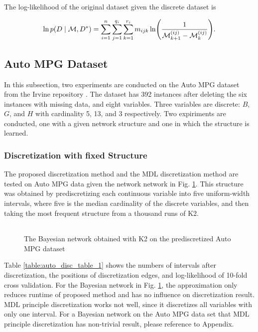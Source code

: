 The log-likelihood of the original dataset given the discrete dataset is

\begin{equation}
  \ln p(D\mid \discset, D^*) = \sum_{i=1}^n \sum_{j=1}^{q_i} \sum_{k=1}^{r_i} m_{ijk} \ln\paren{
    \frac{
      1
    }{
      \discset^{(ij)}_{k+1} - \discset^{(ij)}_{k}
    }
  }\text{.}
\end{equation}

\subsection{Auto MPG Dataset}
\label{subsec:auto}

In this subsection, two experiments are conducted on the Auto MPG dataset from the Irvine repository \citep{Lichman_2013}. The dataset has \num{392} instances after deleting the six instances with missing data, and eight variables. Three variables are discrete: $B$, $G$, and $H$ with cardinality 5, 13, and 3 respectively. Two expiriments are conducted, one with a given network structure and one in which the structure is learned.

\subsubsection{Discretization with fixed Structure}
\label{subsubsec:auto_exp1}

The proposed discretization method and the MDL discretization method are tested on Auto MPG data given the network network in Fig. \ref{fig:auto_graph_1}. This structure was obtained by prediscretizing each continuous variable into five uniform-width intervals, where five is the median cardinality of the discrete variables, and then taking the most frequent structure from a thousand runs of K2.

\begin{figure}[ht]
  \centering
  \begin{tabular}{cc}
    
  \end{tabular}
  \caption{The Bayesian network obtained with K2 on the prediscretized Auto MPG dataset}
  \label{fig:auto_graph_1}
\end{figure}

Table \ref{table:auto_disc_table_1} shows the numbers of intervals after discretization, the positions of discretization edges, and log-likelihood of 10-fold cross validation. For the Bayesian network in Fig. \ref{fig:auto_graph_1}, the approximation only reduces runtime of proposed method and has no influence on discretization result. MDL principle discretization works not well, since it discretizes all variables with only one interval. For a Bayesian network on the Auto MPG data set that MDL principle discretization has non-trivial result, please reference to Appendix.

